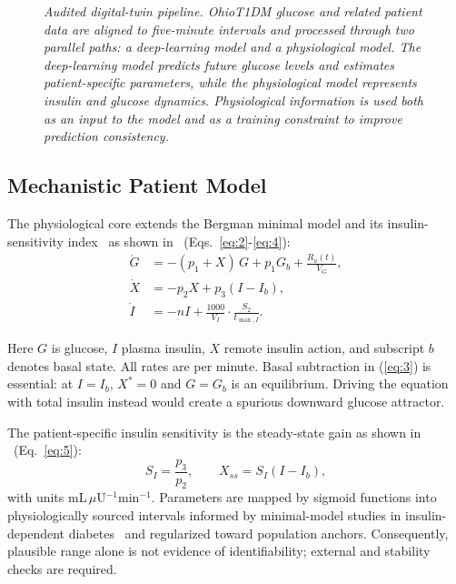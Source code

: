 \documentclass[journal]{IEEEtran}
\begin{document}
\begin{figure}[p]
\begin{tikzpicture}
\end{tikzpicture}

\caption{\small\textit{Audited digital-twin pipeline. OhioT1DM glucose and related patient data are aligned to five-minute intervals and processed through two parallel paths: a deep-learning model and a physiological model. The deep-learning model predicts future glucose levels and estimates patient-specific parameters, while the physiological model represents insulin and glucose dynamics. Physiological information is used both as an input to the model and as a training constraint to improve prediction consistency.
}}
\label{fig:pipeline}
\end{figure}

\subsection{Mechanistic Patient Model}

The physiological core extends the Bergman minimal model and its insulin-sensitivity index~\cite{ref1,ref32} as shown in \ (Eqs.~\eqref{eq:2}-\eqref{eq:4}):
\begin{align}
\dot{G} &= -(p_1 + X)\,G + p_1 G_b + \frac{R_a(t)}{V_G}, \label{eq:2}\\
\dot{X} &= -p_2 X + p_3 (I - I_b), \label{eq:3}\\
\dot{I} &= -nI + \frac{1000}{V_I}\cdot\frac{S_2}{t_{\max,I}}. \label{eq:4}
\end{align}

Here $G$ is glucose, $I$ plasma insulin, $X$ remote insulin action, and subscript $b$ denotes basal state. All rates are per minute. Basal subtraction in (\ref{eq:3}) is essential: at $I = I_b$, $X^* = 0$ and $G = G_b$ is an equilibrium. Driving the equation with total insulin instead would create a spurious downward glucose attractor.

The patient-specific insulin sensitivity is the steady-state gain as shown in \ (Eq.~\eqref{eq:5}):
\begin{equation}
S_I = \frac{p_3}{p_2}, \qquad X_{ss} = S_I (I - I_b),
\label{eq:5}
\end{equation}
with units mL\,$\mu$U$^{-1}$min$^{-1}$. Parameters are mapped by sigmoid functions into physiologically sourced intervals informed by minimal-model studies in insulin-dependent diabetes~\cite{ref33} and regularized toward population anchors. Consequently, plausible range alone is not evidence of identifiability; external and stability checks are required.
\end{document}
